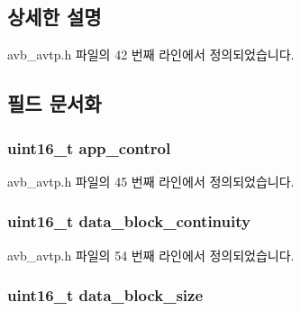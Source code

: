 \subsection{상세한 설명}


avb\+\_\+avtp.\+h 파일의 42 번째 라인에서 정의되었습니다.



\subsection{필드 문서화}
\subsubsection[{\texorpdfstring{app\+\_\+control}{app_control}}]{\setlength{\rightskip}{0pt plus 5cm}uint16\+\_\+t app\+\_\+control}\hypertarget{structsix1883__header_a3b52b2d4d5eb3909d1141c865563f246}{}\label{structsix1883__header_a3b52b2d4d5eb3909d1141c865563f246}


avb\+\_\+avtp.\+h 파일의 45 번째 라인에서 정의되었습니다.

\subsubsection[{\texorpdfstring{data\+\_\+block\+\_\+continuity}{data_block_continuity}}]{\setlength{\rightskip}{0pt plus 5cm}uint16\+\_\+t data\+\_\+block\+\_\+continuity}\hypertarget{structsix1883__header_a9a2bbc5c82d57a50a0b396a8f74b93d1}{}\label{structsix1883__header_a9a2bbc5c82d57a50a0b396a8f74b93d1}


avb\+\_\+avtp.\+h 파일의 54 번째 라인에서 정의되었습니다.

\subsubsection[{\texorpdfstring{data\+\_\+block\+\_\+size}{data_block_size}}]{\setlength{\rightskip}{0pt plus 5cm}uint16\+\_\+t data\+\_\+block\+\_\+size}\hypertarget{structsix1883__header_a70463341a111fa9a10acb9c082870fce}{}\label{structsix1883__header_a70463341a111fa9a10acb9c082870fce}


